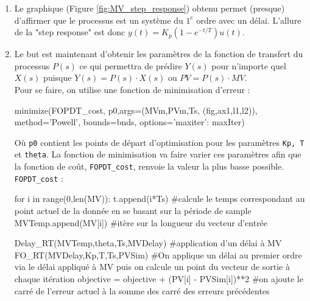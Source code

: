 \begin{enumerate}
    \item Le graphique (Figure \ref{fig:MV_step_response}) obtenu permet (presque) d'affirmer que le processus est un système du $1^{e}$ ordre avec un délai. L'allure de la "step response" est donc $y(t) = K_p (1-e^{-t/T})u(t)$.

    \item Le but est maintenant d'obtenir les paramètres de la fonction de transfert du processus $P(s)$ ce qui permettra de prédire $Y(s)$ pour n'importe quel $X(s)$ puisque $Y(s) = P(s) \cdot X(s)$ ou $PV = P(s)\cdot MV$. 
    \\Pour se faire, on utilise une fonction de minimisation d'erreur : 
    \begin{python*}
        minimize(FOPDT_cost,
            p0,args=(MVm,PVm,Ts,
            (fig,ax1,l1,l2)), 
            method='Powell',
            bounds=bnds,
            options={'maxiter': maxIter})
    \end{python*}

    Où \texttt{p0} contient les points de départ d'optimisation pour les paramètres \texttt{Kp, T} et \texttt{theta}. La fonction de minimisation va faire varier ces paramètres afin que la fonction de coût, \texttt{FOPDT\_cost}, renvoie la valeur la plus basse possible. 
    \\ \texttt{FOPDT\_cost} : 

    \begin{python*}
        for i in range(0,len(MV)):
            t.append(i*Ts) #calcule le temps correspondant au point actuel                  de la donnée en se basant sur la période de sample
            MVTemp.append(MV[i]) #itère sur la longueur du vecteur d'entrée

            Delay_RT(MVTemp,theta,Ts,MVDelay) #application d'un délai à MV  
            FO_RT(MVDelay,Kp,T,Ts,PVSim) #On applique un délai au premier ordre via le délai appliqué à MV puis on calcule un point du vecteur de sortie à chaque itération 
            objective = objective + (PV[i] - PVSim[i])**2 #on ajoute le carré de l'erreur actuel à la somme des carré des erreurs précédentes   
    \end{python*}
\end{enumerate}

